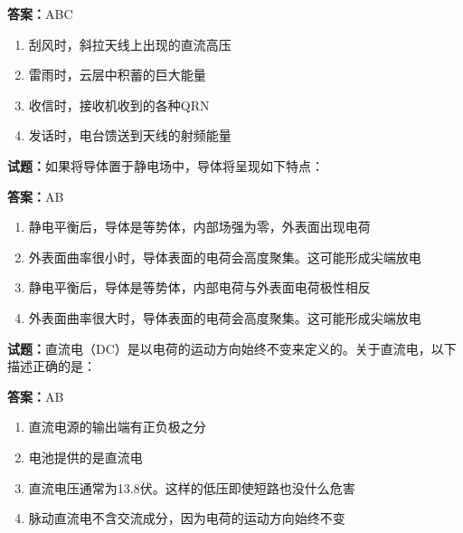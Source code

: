 \documentclass{ctexbook}
\begin{document}
\textbf{答案：}ABC 

\begin{enumerate}[leftmargin=3em]
  \item 刮风时，斜拉天线上出现的直流高压 

  \item 雷雨时，云层中积蓄的巨大能量 

  \item 收信时，接收机收到的各种QRN 

  \item 发话时，电台馈送到天线的射频能量 

\end{enumerate}





\vspace{1em}

\textbf{试题：}如果将导体置于静电场中，导体将呈现如下特点： 

\textbf{答案：}AB 

\begin{enumerate}[leftmargin=3em]
  \item 静电平衡后，导体是等势体，内部场强为零，外表面出现电荷 

  \item 外表面曲率很小时，导体表面的电荷会高度聚集。这可能形成尖端放电 

  \item 静电平衡后，导体是等势体，内部电荷与外表面电荷极性相反 

  \item 外表面曲率很大时，导体表面的电荷会高度聚集。这可能形成尖端放电 

\end{enumerate}





\vspace{1em}

\textbf{试题：}直流电（DC）是以电荷的运动方向始终不变来定义的。关于直流电，以下描述正确的是： 

\textbf{答案：}AB 

\begin{enumerate}[leftmargin=3em]
  \item 直流电源的输出端有正负极之分 

  \item 电池提供的是直流电 

  \item 直流电压通常为13.8伏。这样的低压即使短路也没什么危害 

  \item 脉动直流电不含交流成分，因为电荷的运动方向始终不变 

\end{enumerate}
\end{document}
